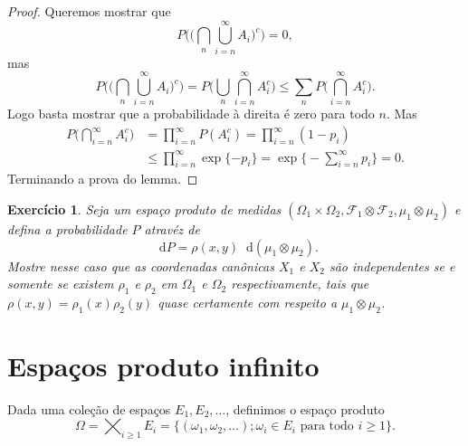 \documentclass[reqno]{article}
\newcommand*\1{\mathds{1}}
\newtheorem{exercise}[example]{Exercício}
\renewcommand*\d{\mathop{}\!\mathrm{d}}
\newcommand{\mcup}{\textstyle \bigcup\limits}
\newcommand{\mcap}{\textstyle \bigcap\limits}
\begin{document}
\begin{proof}
  Queremos mostrar que
  \begin{equation}
    P \Big( \big(\mcap_n \mcup_{i=n}^\infty A_i\big)^c \Big) = 0,
  \end{equation}
  mas
  \begin{equation}
    P \Big( \big(\mcap_n \mcup_{i=n}^\infty A_i\big)^c \Big) = P \Big(\mcup_n \mcap_{i=n}^\infty A_i^c \Big) \leq \sum\limits_n P \Big(\mcap_{i=n}^\infty A_i^c \Big).
  \end{equation}
  Logo basta mostrar que a probabilidade à direita é zero para todo $n$.
  Mas
  \begin{equation}
    \begin{split}
      P \Big(\mcap_{i=n}^\infty A_i^c \Big) & = \prod\limits_{i=n}^\infty P(A_i^c) = \prod\limits_{i=n}^\infty (1 - p_i)\\
      & \leq \prod\limits_{i=n}^\infty \exp\{-p_i\} = \exp\big\{- \sum_{i=n}^\infty p_i\big\} = 0.
    \end{split}
  \end{equation}
  Terminando a prova do lemma.
\end{proof}

\newpage

\begin{exercise}
  Seja um espaço produto de medidas $(\Omega_1 \times \Omega_2, \mathcal{F}_1 \otimes \mathcal{F}_2, \mu_1 \otimes \mu_2)$ e defina a probabilidade $P$ atravéz de
  \begin{equation}
    \d P = \rho(x,y) \d (\mu_1 \otimes \mu_2).
  \end{equation}
  Mostre nesse caso que as coordenadas canônicas $X_1$ e $X_2$ são independentes se e somente se existem $\rho_1$ e $\rho_2$ em $\Omega_1$ e $\Omega_2$ respectivamente, tais que $\rho(x,y) = \rho_1(x) \rho_2(y)$ quase certamente com respeito a $\mu_1 \otimes \mu_2$.
\end{exercise}



\section{Espaços produto infinito}
\label{s:Omega_produto}

Dada uma coleção de espaços $E_1, E_2, \dots$, definimos o espaço produto
\begin{equation}
  \Omega = \bigtimes_{i\geq 1} E_i = \big\{(\omega_1, \omega_2, \dots); \omega_i \in E_i \text{ para todo $i \geq 1$}\big\}.
\end{equation}
\end{document}
